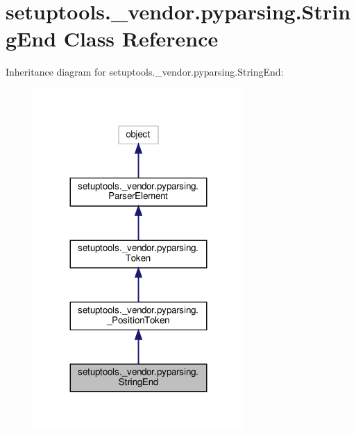 \hypertarget{classsetuptools_1_1__vendor_1_1pyparsing_1_1StringEnd}{}\section{setuptools.\+\_\+vendor.\+pyparsing.\+String\+End Class Reference}
\label{classsetuptools_1_1__vendor_1_1pyparsing_1_1StringEnd}


Inheritance diagram for setuptools.\+\_\+vendor.\+pyparsing.\+String\+End\+:
\nopagebreak
\begin{figure}[H]
\begin{center}
\leavevmode
\includegraphics[width=227pt]{classsetuptools_1_1__vendor_1_1pyparsing_1_1StringEnd__inherit__graph}
\end{center}
\end{figure}


